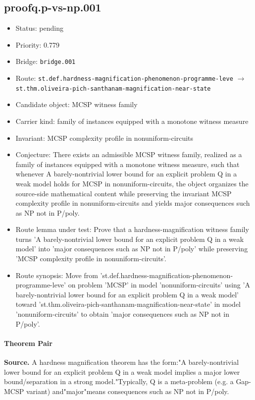 \documentclass[11pt]{article}
\begin{document}
\subsection*{proofq.p-vs-np.001}
\begin{itemize}[leftmargin=*,itemsep=0.25em]
\item Status: pending
\item Priority: 0.779
\item Bridge: \texttt{bridge.001}
\item Route: \texttt{st.def.hardness-magnification-phenomenon-programme-leve} $\rightarrow$ \texttt{st.thm.oliveira-pich-santhanam-magnification-near-state}
\item Candidate object: MCSP witness family
\item Carrier kind: family of instances equipped with a monotone witness measure
\item Invariant: MCSP complexity profile in nonuniform-circuits
\item Conjecture: There exists an admissible MCSP witness family, realized as a family of instances equipped with a monotone witness measure, such that whenever A barely-nontrivial lower bound for an explicit problem Q in a weak model holds for MCSP in nonuniform-circuits, the object organizes the source-side mathematical content while preserving the invariant MCSP complexity profile in nonuniform-circuits and yields major consequences such as NP not in P/poly.
\item Route lemma under test: Prove that a hardness-magnification witness family turns 'A barely-nontrivial lower bound for an explicit problem Q in a weak model' into 'major consequences such as NP not in P/poly' while preserving 'MCSP complexity profile in nonuniform-circuits'.
\item Route synopsis: Move from 'st.def.hardness-magnification-phenomenon-programme-leve' on problem 'MCSP' in model 'nonuniform-circuits' using 'A barely-nontrivial lower bound for an explicit problem Q in a weak model' toward 'st.thm.oliveira-pich-santhanam-magnification-near-state' in model 'nonuniform-circuits' to obtain 'major consequences such as NP not in P/poly'.
\end{itemize}
\paragraph{Theorem Pair}
\textbf{Source.} A hardness magnification theorem has the form:"A barely-nontrivial lower bound for an explicit problem Q in a weak model implies a major lower bound/separation in a strong model."Typically, Q is a meta-problem (e.g. a Gap-MCSP variant) and"major"means consequences such as NP not in P/poly.
\end{document}

